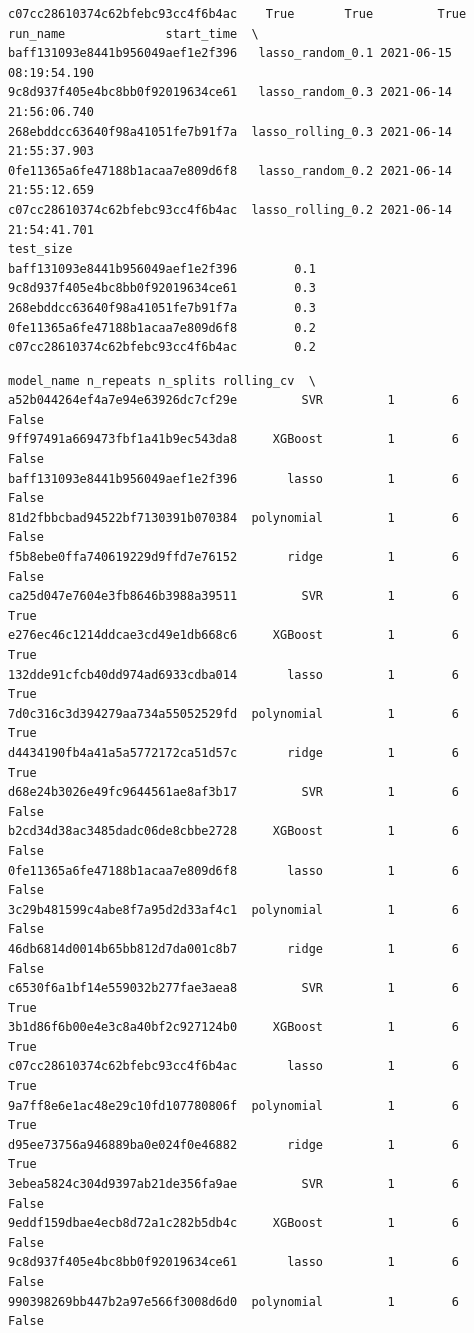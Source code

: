 \begin{verbatim}
c07cc28610374c62bfebc93cc4f6b4ac    True       True         True
run_name              start_time  \
baff131093e8441b956049aef1e2f396   lasso_random_0.1 2021-06-15 08:19:54.190
9c8d937f405e4bc8bb0f92019634ce61   lasso_random_0.3 2021-06-14 21:56:06.740
268ebddcc63640f98a41051fe7b91f7a  lasso_rolling_0.3 2021-06-14 21:55:37.903
0fe11365a6fe47188b1acaa7e809d6f8   lasso_random_0.2 2021-06-14 21:55:12.659
c07cc28610374c62bfebc93cc4f6b4ac  lasso_rolling_0.2 2021-06-14 21:54:41.701
test_size
baff131093e8441b956049aef1e2f396        0.1
9c8d937f405e4bc8bb0f92019634ce61        0.3
268ebddcc63640f98a41051fe7b91f7a        0.3
0fe11365a6fe47188b1acaa7e809d6f8        0.2
c07cc28610374c62bfebc93cc4f6b4ac        0.2
\end{verbatim}
\begin{verbatim}
model_name n_repeats n_splits rolling_cv  \
a52b044264ef4a7e94e63926dc7cf29e         SVR         1        6      False
9ff97491a669473fbf1a41b9ec543da8     XGBoost         1        6      False
baff131093e8441b956049aef1e2f396       lasso         1        6      False
81d2fbbcbad94522bf7130391b070384  polynomial         1        6      False
f5b8ebe0ffa740619229d9ffd7e76152       ridge         1        6      False
ca25d047e7604e3fb8646b3988a39511         SVR         1        6       True
e276ec46c1214ddcae3cd49e1db668c6     XGBoost         1        6       True
132dde91cfcb40dd974ad6933cdba014       lasso         1        6       True
7d0c316c3d394279aa734a55052529fd  polynomial         1        6       True
d4434190fb4a41a5a5772172ca51d57c       ridge         1        6       True
d68e24b3026e49fc9644561ae8af3b17         SVR         1        6      False
b2cd34d38ac3485dadc06de8cbbe2728     XGBoost         1        6      False
0fe11365a6fe47188b1acaa7e809d6f8       lasso         1        6      False
3c29b481599c4abe8f7a95d2d33af4c1  polynomial         1        6      False
46db6814d0014b65bb812d7da001c8b7       ridge         1        6      False
c6530f6a1bf14e559032b277fae3aea8         SVR         1        6       True
3b1d86f6b00e4e3c8a40bf2c927124b0     XGBoost         1        6       True
c07cc28610374c62bfebc93cc4f6b4ac       lasso         1        6       True
9a7ff8e6e1ac48e29c10fd107780806f  polynomial         1        6       True
d95ee73756a946889ba0e024f0e46882       ridge         1        6       True
3ebea5824c304d9397ab21de356fa9ae         SVR         1        6      False
9eddf159dbae4ecb8d72a1c282b5db4c     XGBoost         1        6      False
9c8d937f405e4bc8bb0f92019634ce61       lasso         1        6      False
990398269bb447b2a97e566f3008d6d0  polynomial         1        6      False

\end{verbatim}
